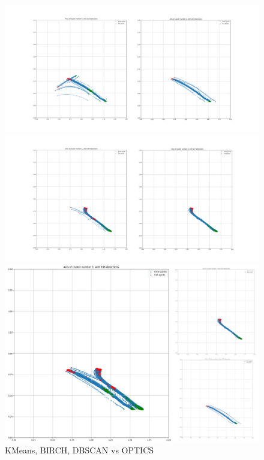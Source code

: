 \documentclass[acmtog, authorversion]{acmart}
\begin{document}
\begin{figure}
    \includegraphics[width=1\columnwidth]{bad_clustering/example_kmeans_vs_optics.png}

    \includegraphics[width=1\columnwidth]{bad_clustering/example_birch_vs_optics.png}

    \includegraphics[width=1\columnwidth]{bad_clustering/example_dbscan_vs_optics_merged_cluster.png}

    \caption{KMeans, BIRCH, DBSCAN vs OPTICS}
    \label{fig: Bad clusters}
\end{figure}
\end{document}
